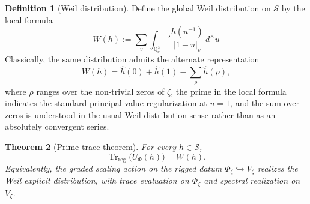 \documentclass[11pt,a4paper]{article}
\theoremstyle{plain}
\newtheorem{theorem}{Theorem}[section]
\theoremstyle{definition}
\newtheorem{definition}[theorem]{Definition}
\newcommand{\Q}{\mathbb{Q}}
\newcommand{\Trreg}{\operatorname{Tr}_{\mathrm{reg}}}
\newcommand{\dmu}{d^{\times}}
\begin{document}
\begin{definition}[Weil distribution]
\label{def:weil}
Define the global Weil distribution on $\mathscr S$ by the local formula
\[
  W(h):=\sum_{v}\int_{\Q_v^{\times}}' \frac{h(u^{-1})}{|1-u|_v}\,\dmu u
\]
Classically, the same distribution admits the alternate representation
\[
  W(h)=\widehat h(0)+\widehat h(1)-\sum_{\rho}\widehat h(\rho),
\]
where $\rho$ ranges over the non-trivial zeros of $\zeta$, the prime in the local formula indicates the standard principal-value regularization at $u=1$, and the sum over zeros is understood in the usual Weil-distribution sense rather than as an absolutely convergent series.
\end{definition}

\begin{theorem}[Prime-trace theorem]
\label{thm:primetrace}
For every $h\in\mathscr S$,
\[
  \Trreg\bigl(U_{\Phi}(h)\bigr)=W(h).
\]
Equivalently, the graded scaling action on the rigged datum $\Phi_{\zeta}\hookrightarrow V_{\zeta}$ realizes the Weil explicit distribution, with trace evaluation on $\Phi_{\zeta}$ and spectral realization on $V_{\zeta}$.
\end{theorem}
\end{document}
